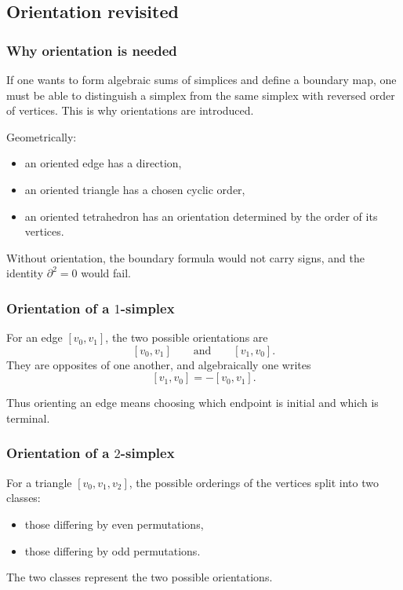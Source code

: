 \documentclass[12pt,a4paper]{article}
\theoremstyle{notespace}
\begin{document}
\subsection{Orientation revisited}

\subsubsection{Why orientation is needed}

If one wants to form algebraic sums of simplices and define a boundary map, one must be able to distinguish a simplex from the same simplex with reversed order of vertices. This is why orientations are introduced.

Geometrically:
\begin{itemize}
	\item an oriented edge has a direction,
	\item an oriented triangle has a chosen cyclic order,
	\item an oriented tetrahedron has an orientation determined by the order of its vertices.
\end{itemize}

Without orientation, the boundary formula would not carry signs, and the identity \(\partial^2=0\) would fail.

\subsubsection{Orientation of a \texorpdfstring{$1$}{1}-simplex}

For an edge \([v_0,v_1]\), the two possible orientations are
\[
[v_0,v_1]
\qquad\text{and}\qquad
[v_1,v_0].
\]
They are opposites of one another, and algebraically one writes
\[
[v_1,v_0] = -[v_0,v_1].
\]

Thus orienting an edge means choosing which endpoint is initial and which is terminal.

\subsubsection{Orientation of a \texorpdfstring{$2$}{2}-simplex}

For a triangle \([v_0,v_1,v_2]\), the possible orderings of the vertices split into two classes:
\begin{itemize}
	\item those differing by even permutations,
	\item those differing by odd permutations.
\end{itemize}
The two classes represent the two possible orientations.
\end{document}
